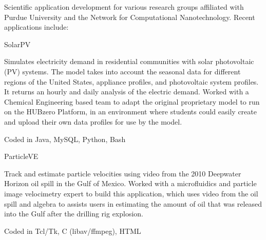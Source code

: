 \documentclass[10pt]{article}
\begin{document}
\begin{outerlist}
\begin{innerlist}
            \item Scientific application development for various
                research groups affiliated with Purdue University
                and the Network for Computational Nanotechnology.
                \hfill Recent applications include:
                \begin{innerlist}
                    \item[] SolarPV
                        \begin{innerlist}
                            \item[] Simulates electricity demand in residential
                              communities with solar photovoltaic (PV) systems.
                              The model takes into account the seasonal data for
                              different regions of the United States, appliance
                              profiles, and photovoltaic system profiles. It
                              returns an hourly and daily analysis of the
                              electric demand. Worked with a Chemical Engineering
                              based team to adapt the original proprietary model
                              to run on the HUBzero Platform, in an environment
                              where students could easily create and upload their own
                              data profiles for use by the model.
                            \item[] Coded in Java, MySQL, Python, Bash
                            \item[] 
                        \end{innerlist}
                    \item[] ParticleVE
                        \begin{innerlist}
                            \item[] Track and estimate particle velocities
                              using video from the 2010 Deepwater Horizon
                              oil spill in the Gulf of Mexico. Worked with
                              a microfluidics and particle image velocimetry
                              expert to build this application, which uses
                              video from the oil spill and algebra to
                              assists users in estimating the amount of oil
                              that was released into the Gulf after the
                              drilling rig explosion.
                            \item[] Coded in Tcl/Tk, C (libav/ffmpeg), HTML

\end{innerlist}
\end{innerlist}
\end{innerlist}
\end{outerlist}
\end{document}
